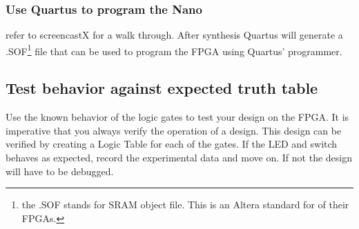       \subsubsection{Use Quartus to program the Nano} refer to screencastX for a walk through. After synthesis Quartus will generate a .SOF\footnote{the .SOF stands for SRAM object file. This is an Altera standard for of their FPGAs.} file that can be used to program the FPGA using Quartus' programmer.

      \subsection{Test behavior against expected truth table} 
      Use the known behavior of the logic gates to test your design on the FPGA. It is imperative that you always verify the operation of a design. This design can be verified by creating a Logic Table for each of the gates. If the LED and switch behaves as expected, record the experimental data and move on. If not the design will have to be debugged.


